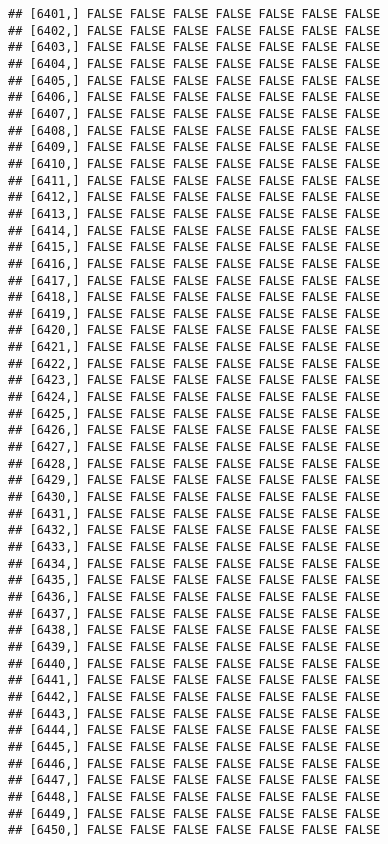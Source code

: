 \documentclass[
]{article}
\begin{document}
\begin{verbatim}
## [6401,] FALSE FALSE FALSE FALSE FALSE FALSE FALSE
## [6402,] FALSE FALSE FALSE FALSE FALSE FALSE FALSE
## [6403,] FALSE FALSE FALSE FALSE FALSE FALSE FALSE
## [6404,] FALSE FALSE FALSE FALSE FALSE FALSE FALSE
## [6405,] FALSE FALSE FALSE FALSE FALSE FALSE FALSE
## [6406,] FALSE FALSE FALSE FALSE FALSE FALSE FALSE
## [6407,] FALSE FALSE FALSE FALSE FALSE FALSE FALSE
## [6408,] FALSE FALSE FALSE FALSE FALSE FALSE FALSE
## [6409,] FALSE FALSE FALSE FALSE FALSE FALSE FALSE
## [6410,] FALSE FALSE FALSE FALSE FALSE FALSE FALSE
## [6411,] FALSE FALSE FALSE FALSE FALSE FALSE FALSE
## [6412,] FALSE FALSE FALSE FALSE FALSE FALSE FALSE
## [6413,] FALSE FALSE FALSE FALSE FALSE FALSE FALSE
## [6414,] FALSE FALSE FALSE FALSE FALSE FALSE FALSE
## [6415,] FALSE FALSE FALSE FALSE FALSE FALSE FALSE
## [6416,] FALSE FALSE FALSE FALSE FALSE FALSE FALSE
## [6417,] FALSE FALSE FALSE FALSE FALSE FALSE FALSE
## [6418,] FALSE FALSE FALSE FALSE FALSE FALSE FALSE
## [6419,] FALSE FALSE FALSE FALSE FALSE FALSE FALSE
## [6420,] FALSE FALSE FALSE FALSE FALSE FALSE FALSE
## [6421,] FALSE FALSE FALSE FALSE FALSE FALSE FALSE
## [6422,] FALSE FALSE FALSE FALSE FALSE FALSE FALSE
## [6423,] FALSE FALSE FALSE FALSE FALSE FALSE FALSE
## [6424,] FALSE FALSE FALSE FALSE FALSE FALSE FALSE
## [6425,] FALSE FALSE FALSE FALSE FALSE FALSE FALSE
## [6426,] FALSE FALSE FALSE FALSE FALSE FALSE FALSE
## [6427,] FALSE FALSE FALSE FALSE FALSE FALSE FALSE
## [6428,] FALSE FALSE FALSE FALSE FALSE FALSE FALSE
## [6429,] FALSE FALSE FALSE FALSE FALSE FALSE FALSE
## [6430,] FALSE FALSE FALSE FALSE FALSE FALSE FALSE
## [6431,] FALSE FALSE FALSE FALSE FALSE FALSE FALSE
## [6432,] FALSE FALSE FALSE FALSE FALSE FALSE FALSE
## [6433,] FALSE FALSE FALSE FALSE FALSE FALSE FALSE
## [6434,] FALSE FALSE FALSE FALSE FALSE FALSE FALSE
## [6435,] FALSE FALSE FALSE FALSE FALSE FALSE FALSE
## [6436,] FALSE FALSE FALSE FALSE FALSE FALSE FALSE
## [6437,] FALSE FALSE FALSE FALSE FALSE FALSE FALSE
## [6438,] FALSE FALSE FALSE FALSE FALSE FALSE FALSE
## [6439,] FALSE FALSE FALSE FALSE FALSE FALSE FALSE
## [6440,] FALSE FALSE FALSE FALSE FALSE FALSE FALSE
## [6441,] FALSE FALSE FALSE FALSE FALSE FALSE FALSE
## [6442,] FALSE FALSE FALSE FALSE FALSE FALSE FALSE
## [6443,] FALSE FALSE FALSE FALSE FALSE FALSE FALSE
## [6444,] FALSE FALSE FALSE FALSE FALSE FALSE FALSE
## [6445,] FALSE FALSE FALSE FALSE FALSE FALSE FALSE
## [6446,] FALSE FALSE FALSE FALSE FALSE FALSE FALSE
## [6447,] FALSE FALSE FALSE FALSE FALSE FALSE FALSE
## [6448,] FALSE FALSE FALSE FALSE FALSE FALSE FALSE
## [6449,] FALSE FALSE FALSE FALSE FALSE FALSE FALSE
## [6450,] FALSE FALSE FALSE FALSE FALSE FALSE FALSE

\end{verbatim}
\end{document}
